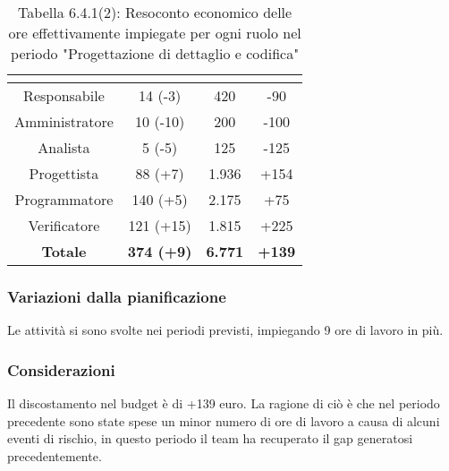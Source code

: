 \renewcommand{\arraystretch}{1.4}
\begin{table}[H]
\begin{center}
\begin{tabular}{|c|c|c|c|}
\hline
\rowcolor{title_row}
\textbf{\color{title_text}{Ruolo}}  & \textbf{\color{title_text}{Ore}} & \textbf{\color{title_text}{Costo in \euro}} & \textbf{\color{title_text}{Differenza al preventivo in \euro}} \\ \hline
Responsabile    & 14 (-3) & 420 & -90\\  \hline
Amministratore  & 10 (-10)& 200 & -100 \\ \hline
Analista        & 5 (-5) & 125 & -125 \\ \hline
Progettista     & 88 (+7) & 1.936 & +154\\ \hline
Programmatore   & 140 (+5) & 2.175 & +75\\ \hline
Verificatore    & 121 (+15) & 1.815& +225\\ \hline
\textbf{Totale} & \textbf{374 (+9)}    & \textbf{6.771} & \textbf{+139} \\ \hline
\end{tabular}
\caption{Tabella 6.4.1(2): Resoconto economico delle ore effettivamente impiegate per ogni ruolo nel periodo "Progettazione di dettaglio e codifica"\label{}}
\end{center}
\end{table}
\renewcommand{\arraystretch}{1}


\subsubsection{Variazioni dalla pianificazione}
Le attività si sono svolte nei periodi previsti, impiegando 9 ore di lavoro in più.

\subsubsection{Considerazioni}
Il discostamento nel budget è di +139 euro. La ragione di ciò è che nel periodo precedente sono state spese un minor numero di ore di lavoro a causa di alcuni eventi di rischio, in questo periodo il team ha recuperato il gap generatosi precedentemente. 

\pagebreak
